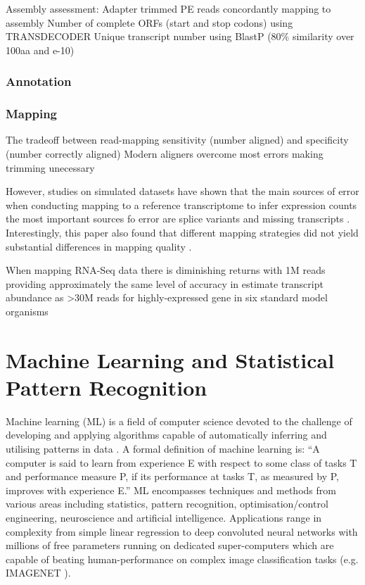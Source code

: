 Assembly assessment:
Adapter trimmed PE reads concordantly mapping to assembly \citep{MacManes2014} 
Number of complete ORFs (start and stop codons) using TRANSDECODER 
Unique transcript number using BlastP (80\% similarity over 100aa and e-10)


\subsubsection{Annotation}

\subsubsection{Mapping}

The tradeoff between read-mapping sensitivity (number aligned) and specificity (number correctly aligned)
Modern aligners overcome most errors making trimming unecessary \citep{DelFabbro2013}





However, studies on simulated datasets have shown that the main sources of error
when conducting mapping to a reference transcriptome to infer expression counts
the most important sources fo error are splice variants and missing transcripts
\citep{Pyrkosz2013}.  Interestingly, this paper also found that different mapping
strategies did not yield substantial differences in mapping quality \citep{Pyrkosz2013}.

When mapping RNA-Seq data there is diminishing returns with 1M reads providing 
approximately the same level of accuracy in estimate transcript abundance 
as >30M reads for highly-expressed gene in six standard model organisms \citep{Lei2014} 




\section{Machine Learning and Statistical Pattern Recognition}

Machine learning (ML) is a field of computer science 
devoted to the challenge of developing and applying algorithms capable of 
automatically inferring and utilising patterns in data \citep{Murphy2012}.
A formal definition of machine learning is:
``A computer is said to learn from experience E with respect to some class of tasks 
T and performance measure P, if its performance at tasks T, as measured by P, improves 
with experience E.'' \citep{Mitchell1997}
ML encompasses techniques and methods from various areas including statistics,
pattern recognition, optimisation/control engineering, neuroscience and artificial intelligence.
Applications range in complexity from simple linear regression to deep convoluted neural networks 
with millions of free parameters running on dedicated super-computers \citep{Wu2014} 
which are capable of beating human-performance on complex image classification tasks 
(e.g. IMAGENET \citep{Berg2014,He2015}).

